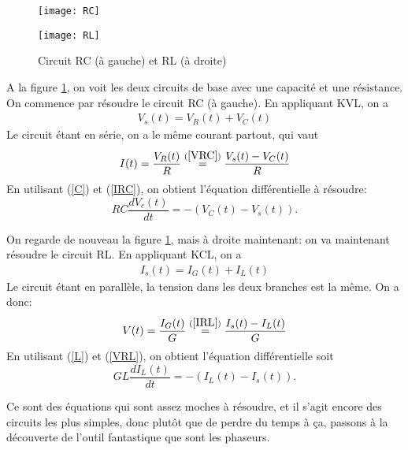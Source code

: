 \begin{figure}[H]
\centering
\begin{minipage}{.35\linewidth}
\texttt{[image: RC]}
\end{minipage}
\hfill
\begin{minipage}{.35\linewidth}
\texttt{[image: RL]}
\end{minipage}
\caption{Circuit RC (à gauche) et RL (à droite)}
\label{RCRL}
\end{figure}

A la figure \ref{RCRL}, on voit les deux circuits de base avec une capacité et une résistance.
On commence par résoudre le circuit RC (à gauche). En appliquant KVL, on a
\begin{align}
V_s(t) = V_R(t) + V_C(t) \label{VRC}
\end{align}
Le circuit étant en série, on a le même courant partout, qui vaut
\begin{align}
I(t) = \frac{V_R(t)}{R} \stackrel{(\ref{VRC})}{=} \frac{V_s(t) - V_C(t)}{R} \label{IRC}
\end{align}
En utilisant (\ref{C}) et (\ref{IRC}), on obtient l'équation différentielle à résoudre: \begin{equation}
 RC\frac{dV_c(t)}{dt} = -(V_C(t) - V_s(t))\label{RCequa}.\end{equation}

On regarde de nouveau la figure \ref{RCRL}, mais à droite maintenant: on va maintenant résoudre le circuit RL. En appliquant KCL, on a
\begin{align}
I_s(t) = I_G(t) + I_L(t) \label{IRL}
\end{align}
Le circuit étant en parallèle, la tension dans les deux branches est la même. On a donc:
\begin{align}
V(t) = \frac{I_G(t)}{G} \stackrel{(\ref{IRL})}{=} \frac{I_s(t) - I_L(t)}{G} \label{VRL}
\end{align}
En utilisant (\ref{L}) et (\ref{VRL}), on obtient l'équation différentielle soit \begin{equation}
GL\frac{dI_L(t)}{dt} = -(I_L(t) - I_s(t))\label{RLequa}.\end{equation}

Ce sont des équations qui sont assez moches à résoudre, et il s'agit encore des circuits les plus simples, donc plutôt que de perdre du temps à ça, passons à la découverte de l'outil fantastique que sont les phaseurs.
